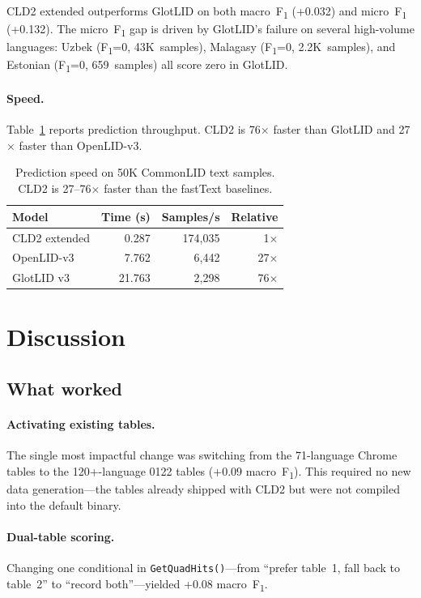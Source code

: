 \documentclass{article}
\newcommand{\fone}{F\textsubscript{1}}
\begin{document}
CLD2 extended outperforms GlotLID on both macro~\fone{} (+0.032) and micro~\fone{} (+0.132).
The micro~\fone{} gap is driven by GlotLID's failure on several high-volume languages: Uzbek (\fone{}=0, 43K~samples), Malagasy (\fone{}=0, 2.2K~samples), and Estonian (\fone{}=0, 659~samples) all score zero in GlotLID.

\paragraph{Speed.}
Table~\ref{tab:speed} reports prediction throughput.
CLD2 is 76$\times$ faster than GlotLID and 27$\times$ faster than OpenLID-v3.

\begin{table}[t]
\centering
\small
\begin{tabular}{@{}lrrr@{}}
\toprule
Model & Time (s) & Samples/s & Relative \\
\midrule
CLD2 extended & 0.287 & 174,035 & 1$\times$ \\
OpenLID-v3 & 7.762 & 6,442 & 27$\times$ \\
GlotLID v3 & 21.763 & 2,298 & 76$\times$ \\
\bottomrule
\end{tabular}
\caption{Prediction speed on 50K CommonLID text samples. CLD2 is 27--76$\times$ faster than the fastText baselines.}
\label{tab:speed}
\end{table}

\section{Discussion}
\label{sec:discussion}

\subsection{What worked}

\paragraph{Activating existing tables.}
The single most impactful change was switching from the 71-language Chrome tables to the 120+-language 0122 tables (+0.09 macro~\fone{}).
This required no new data generation---the tables already shipped with CLD2 but were not compiled into the default binary.

\paragraph{Dual-table scoring.}
Changing one conditional in \texttt{GetQuadHits()}---from ``prefer table~1, fall back to table~2'' to ``record both''---yielded +0.08 macro~\fone{}.
\end{document}
